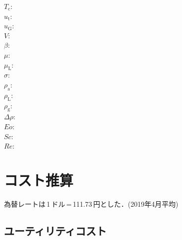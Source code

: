 \documentclass[a4j]{jsreport}
\begin{document}
\begin{multicols}{2}
\begin{flushleft}
    $T_{\mathrm{c}}$:\\
    $u_{\mathrm{t}}$:\\
    $u_{\mathrm{G}}$:\\
    $V$:\\
    $\beta$:\\
    $\mu$:\\
    $\mu_{\mathrm{L}}$:\\
    $\sigma$:\\
    $\rho_{\mathrm{a}}$:\\
    $\rho_{\mathrm{L}}$:\\
    $\rho_{\mathrm{g}}$:\\
    $\Delta\rho$:\\
    $Eo$:\\
    $Sc$:\\
    $Re$:
\end{flushleft}
\end{multicols}

\appendix
\chapter{コスト推算}

為替レートは\,1\,ドル\,=\,111.73\,円とした．(2019年4月平均)
\section{ユーティリティコスト}
\end{document}
